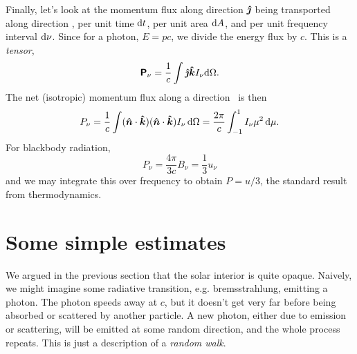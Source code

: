 Finally, let's look at the momentum flux along direction $\bm{\hat{\jmath}}$ being transported along direction \unitk, per unit time $\mathrm{d} t$, per unit area $\mathrm{d} A$, and per unit frequency interval $\mathrm{d}\nu$.  Since for a photon, $E = pc$, we divide the energy flux by $c$.
This is a \emph{tensor},
\begin{equation}\label{e.radiation-pressure-tensor}
\bm{\mathsf{P}}_{\nu} = \frac{1}{c}\int \bm{\hat{\jmath}}\bm{\hat{k}} I_{\nu}\mathrm{d}\Omega.
\end{equation}
The net (isotropic) momentum flux along a direction \unitn\ is then
\[ P_{\nu} = \frac{1}{c}\int (\bm{\hat{n}}\cdot\bm{\hat{k}})(\bm{\hat{n}}\cdot\bm{\hat{k}}) I_{\nu}\,\mathrm{d} \Omega = \frac{2\pi}{c}\int_{-1}^{1} I_{\nu}\mu^{2}\,\mathrm{d}\mu. \]
For blackbody radiation, 
\[ P_{\nu} = \frac{4\pi}{3c} B_{\nu}  = \frac{1}{3}u_{\nu}\]
and we may integrate this over frequency to obtain $P = u/3$, the standard result from thermodynamics.

\section{Some simple estimates}

We argued in the previous section that the solar interior is quite opaque. Naively, we might imagine some radiative transition, e.g. bremsstrahlung, emitting a photon.  The photon speeds away at $c$, but it doesn't get very far before being absorbed or scattered by another particle. A new photon, either due to emission or scattering, will be emitted at some random direction, and the whole process repeats. This is just a description of a \emph{random walk}. 

